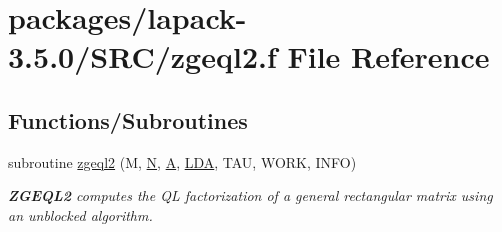 \hypertarget{zgeql2_8f}{}\section{packages/lapack-\/3.5.0/\+S\+R\+C/zgeql2.f File Reference}
\label{zgeql2_8f}
\subsection*{Functions/\+Subroutines}
\begin{DoxyCompactItemize}
\item 
subroutine \hyperlink{group__complex16GEcomputational_gaae01a329f8f1958d643005e502c0618a}{zgeql2} (M, \hyperlink{polmisc_8c_a0240ac851181b84ac374872dc5434ee4}{N}, \hyperlink{classA}{A}, \hyperlink{example__user_8c_ae946da542ce0db94dced19b2ecefd1aa}{L\+D\+A}, T\+A\+U, W\+O\+R\+K, I\+N\+F\+O)
\begin{DoxyCompactList}\small\item\em {\bfseries Z\+G\+E\+Q\+L2} computes the Q\+L factorization of a general rectangular matrix using an unblocked algorithm. \end{DoxyCompactList}\end{DoxyCompactItemize}
